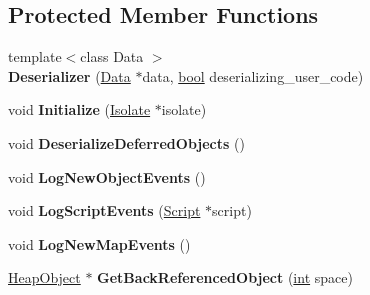 \subsection*{Protected Member Functions}
\begin{DoxyCompactItemize}
\item 
\mbox{\label{classv8_1_1internal_1_1Deserializer_a3139d45a84bc2b1eca5691231e58bb9e}} 
{\footnotesize template$<$class Data $>$ }\\{\bfseries Deserializer} (\mbox{\hyperlink{classv8_1_1Data}{Data}} $\ast$data, \mbox{\hyperlink{classbool}{bool}} deserializing\+\_\+user\+\_\+code)
\item 
\mbox{\label{classv8_1_1internal_1_1Deserializer_a1466d0682628662163d3b9fbaab41a1e}} 
void {\bfseries Initialize} (\mbox{\hyperlink{classv8_1_1internal_1_1Isolate}{Isolate}} $\ast$isolate)
\item 
\mbox{\label{classv8_1_1internal_1_1Deserializer_a89963f6dbee71f8241c29da5d8c9e4df}} 
void {\bfseries Deserialize\+Deferred\+Objects} ()
\item 
\mbox{\label{classv8_1_1internal_1_1Deserializer_aafd133208a6d73b6882a0b6fc9f4bfc2}} 
void {\bfseries Log\+New\+Object\+Events} ()
\item 
\mbox{\label{classv8_1_1internal_1_1Deserializer_afb15f3186fa9d8bcc584a3e350ce007c}} 
void {\bfseries Log\+Script\+Events} (\mbox{\hyperlink{classv8_1_1internal_1_1Script}{Script}} $\ast$script)
\item 
\mbox{\label{classv8_1_1internal_1_1Deserializer_a5bebec2574c347f736a4dc5cd40ff9a5}} 
void {\bfseries Log\+New\+Map\+Events} ()
\item 
\mbox{\label{classv8_1_1internal_1_1Deserializer_a5d171b0586015f2e9988cac14149d41b}} 
\mbox{\hyperlink{classv8_1_1internal_1_1HeapObject}{Heap\+Object}} $\ast$ {\bfseries Get\+Back\+Referenced\+Object} (\mbox{\hyperlink{classint}{int}} space)
\item 
\mbox{\label{classv8_1_1internal_1_1Deserializer_a83f278e70cb5e98cc018ea0f00a1947b}} 

\end{DoxyCompactItemize}

